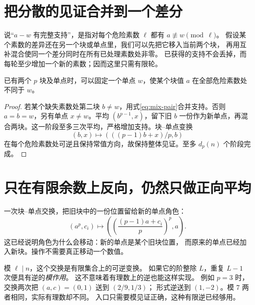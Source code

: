 \section{把分散的见证合并到一个差分}
说“$a-w$ 有完整支持”，是指对每个危险素数 $\ell$ 都有 $a\not\equiv w\pmod\ell$。
假设某个素数的差异还在另一个块或单点里，我们可以先把它移入当前两个块，
再用互补混合使同一个差分同时在所有已处理素数处非零。
已获得的支持不会丢掉，而每轮至少增加一个新的素数；因而这里只需有限轮。

\begin{lemma}[把同余见证集中到一个差分]\label{lem:concentrate}
已有两个 $p$ 块及单点时，可以固定一个单点 $w$，使某个块值 $a$ 在全部危险素数处不同于 $w$。
\end{lemma}
\begin{proof}
若某个缺失素数处第二块 $b\ne w$，用式\eqref{eq:mix-pair}合并支持。否则 $a=b=w$，另有单点 $x\ne w$。平均 $(b^{p-1},x)$，留下旧 $b$ 一份作为新单点，再混合两块。这一阶段至多三次平均，严格增加支持。块--单点变换
\begin{equation}\label{eq:exchange}
(b,x)\longmapsto(((p-1)b+x)/p,b)
\end{equation}
在每个危险素数处可逆且保持常值方向，故保持整体见证。至多 $d_p(n)$ 个阶段完成。
\end{proof}


\section{只在有限余数上反向，仍然只做正向平均}
一次块--单点交换，把旧块中的一份位置留给新的单点角色：
\[
(a^p,c_i)\longmapsto
\left(\left(\frac{(p-1)a+c_i}{p}\right)^p,a\right).
\]
这已经说明角色为什么会移动：新的单点是某个旧块位置，
而原来的单点已经加入新块。操作不需要真正移动一个数值。

模 $\ell\mid n$，这个交换是有限集合上的可逆变换。
如果它的阶整除 $L$，重复 $L-1$ 次便具有逆的\emph{模作用}。
这不意味着有理数上的逆也能这样实现。
例如 $p=3$ 时，交换两次把 $(a,c)=(0,1)$ 送到 $(2/9,1/3)$；
形式逆送到 $(1,-2)$。模 $7$ 两者相同，实际有理数却不同。
入口只需要模见证正确，这种有限逆已经够用。

